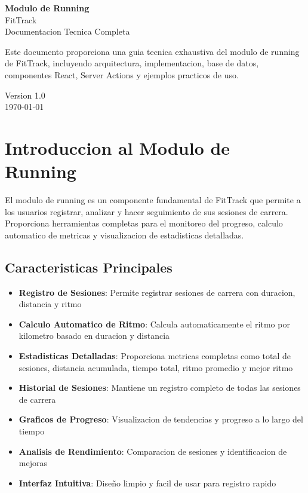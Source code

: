 \documentclass[12pt,a4paper]{article}
\begin{document}
\begin{titlepage}
\centering
\vspace*{2cm}

{\Huge\bfseries Modulo de Running}\\[0.5cm]
{\LARGE FitTrack}\\[1cm]

{\large Documentacion Tecnica Completa}\\[2cm]

\begin{minipage}{0.8\textwidth}
\centering
Este documento proporciona una guia tecnica exhaustiva del modulo de running de FitTrack, incluyendo arquitectura, implementacion, base de datos, componentes React, Server Actions y ejemplos practicos de uso.
\end{minipage}

\vfill

{\large Version 1.0}\\[0.5cm]
{\large \today}

\end{titlepage}

\tableofcontents
\newpage

\section{Introduccion al Modulo de Running}

El modulo de running es un componente fundamental de FitTrack que permite a los usuarios registrar, analizar y hacer seguimiento de sus sesiones de carrera. Proporciona herramientas completas para el monitoreo del progreso, calculo automatico de metricas y visualizacion de estadisticas detalladas.

\subsection{Caracteristicas Principales}

\begin{itemize}
    \item \textbf{Registro de Sesiones}: Permite registrar sesiones de carrera con duracion, distancia y ritmo
    \item \textbf{Calculo Automatico de Ritmo}: Calcula automaticamente el ritmo por kilometro basado en duracion y distancia
    \item \textbf{Estadisticas Detalladas}: Proporciona metricas completas como total de sesiones, distancia acumulada, tiempo total, ritmo promedio y mejor ritmo
    \item \textbf{Historial de Sesiones}: Mantiene un registro completo de todas las sesiones de carrera
    \item \textbf{Graficos de Progreso}: Visualizacion de tendencias y progreso a lo largo del tiempo
    \item \textbf{Analisis de Rendimiento}: Comparacion de sesiones y identificacion de mejoras
    \item \textbf{Interfaz Intuitiva}: Diseño limpio y facil de usar para registro rapido
\end{itemize}
\end{document}
